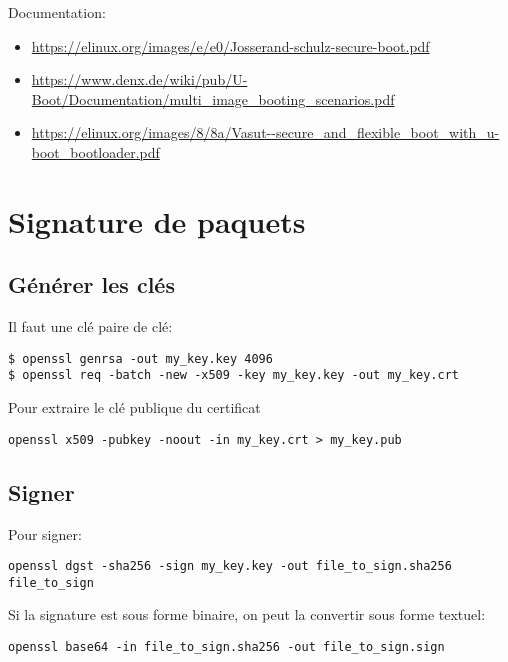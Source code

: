 \documentclass[compress,aspectratio=169]{beamer}
\begin{document}
\begin{frame}[fragile]
Documentation:
\begin{itemize}
\item \url{https://elinux.org/images/e/e0/Josserand-schulz-secure-boot.pdf}
\item \url{https://www.denx.de/wiki/pub/U-Boot/Documentation/multi_image_booting_scenarios.pdf}
\item \url{https://elinux.org/images/8/8a/Vasut--secure_and_flexible_boot_with_u-boot_bootloader.pdf}
\end{itemize}
\end{frame}

\section{Signature de paquets}

\subsection{Générer les clés}
\begin{frame}[fragile]
Il faut une clé paire de clé:
\begin{lstlisting}[style=shell]
$ openssl genrsa -out my_key.key 4096
$ openssl req -batch -new -x509 -key my_key.key -out my_key.crt
\end{lstlisting}
Pour extraire le clé publique du certificat
\begin{lstlisting}[style=shell]
openssl x509 -pubkey -noout -in my_key.crt > my_key.pub
\end{lstlisting}
\end{frame}

\subsection{Signer}
\begin{frame}[fragile]
Pour signer:
\begin{lstlisting}[style=shell]
openssl dgst -sha256 -sign my_key.key -out file_to_sign.sha256 file_to_sign
\end{lstlisting}
Si la signature est sous forme binaire, on peut la convertir sous forme textuel:
\begin{lstlisting}[style=shell]
openssl base64 -in file_to_sign.sha256 -out file_to_sign.sign
\end{lstlisting}
\end{frame}
\end{document}
